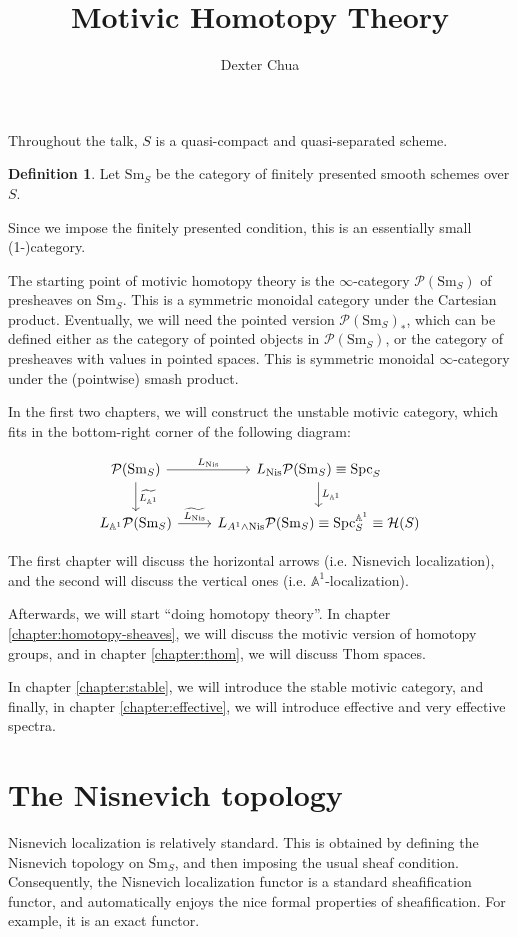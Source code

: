 \documentclass{shortart}
\title{Motivic Homotopy Theory}
\author{Dexter Chua}
\theoremstyle{definition}
\newtheorem{defi}[thm]{Definition}
\newcommand\Sm{\mathrm{Sm}}
\newcommand\Spc{\mathrm{Spc}}
\newcommand\Nis{\mathrm{Nis}}
\newcommand\Pre{\mathcal{P}}
\renewcommand\H{\mathcal{H}}
\newcommand\A{\mathbb{A}}
\begin{document}
Throughout the talk, $S$ is a quasi-compact and quasi-separated scheme.

\begin{defi}
  Let $\Sm_S$ be the category of finitely presented smooth schemes over $S$.
\end{defi}
Since we impose the finitely presented condition, this is an essentially small (1-)category.

The starting point of motivic homotopy theory is the $\infty$-category $\Pre(\Sm_S)$ of presheaves on $\Sm_S$. This is a symmetric monoidal category under the Cartesian product. Eventually, we will need the pointed version $\Pre(\Sm_S)_*$, which can be defined either as the category of pointed objects in $\Pre(\Sm_S)$, or the category of presheaves with values in pointed spaces. This is symmetric monoidal $\infty$-category under the (pointwise) smash product.

In the first two chapters, we will construct the unstable motivic category, which fits in the bottom-right corner of the following diagram:
\begin{useimager}
  \[
    \begin{tikzcd}
      \Pre(\Sm_S) \ar[r, "L_{\Nis}"] \ar[d, "\widetilde{L_{\A^1}}"] & L_{\Nis} \Pre(\Sm_S) \equiv \Spc_S \ar[d, "L_{\A^1}"]\\
      L_{\A^1} \Pre(\Sm_S) \ar[r, "\widetilde{L_{\Nis}}"] & L_{A^1 \wedge \Nis} \Pre(\Sm_S) \equiv \Spc_S^{\A^1} \equiv \H(S)
    \end{tikzcd}
  \]
\end{useimager}
The first chapter will discuss the horizontal arrows (i.e. Nisnevich localization), and the second will discuss the vertical ones (i.e. $\A^1$-localization).

Afterwards, we will start ``doing homotopy theory''. In chapter \ref{chapter:homotopy-sheaves}, we will discuss the motivic version of homotopy groups, and in chapter \ref{chapter:thom}, we will discuss Thom spaces.

In chapter \ref{chapter:stable}, we will introduce the stable motivic category, and finally, in chapter \ref{chapter:effective}, we will introduce effective and very effective spectra.

\section{The Nisnevich topology}
Nisnevich localization is relatively standard. This is obtained by defining the Nisnevich topology on $\Sm_S$, and then imposing the usual sheaf condition. Consequently, the Nisnevich localization functor is a standard sheafification functor, and automatically enjoys the nice formal properties of sheafification. For example, it is an exact functor.
\end{document}
